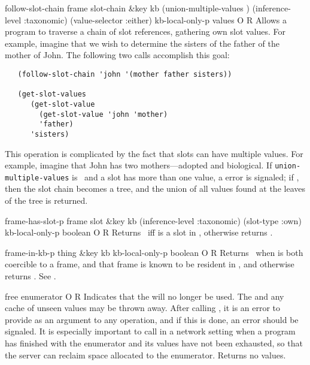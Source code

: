 \begin{okbcop}{follow-slot-chain}{ frame slot-chain \&key kb (union-multiple-values \true) (inference-level :taxonomic) (value-selector :either) kb-local-only-p} { values } { O } { R } {  }
Allows a program to traverse a chain of slot references,
   gathering own slot values.  For example, imagine that we wish to determine
   the sisters of the father of the mother of John.  The following two calls
   accomplish this goal:
   \begin{verbatim}
   (follow-slot-chain 'john '(mother father sisters))
	
   (get-slot-values
      (get-slot-value
        (get-slot-value 'john 'mother)
        'father)
      'sisters)
   \end{verbatim}
   This operation is complicated by the fact that slots can have multiple
   values.  For example, imagine that John has two mothers---adopted and
   biological.  If {\tt union-multiple-values} is \false\ and a slot
   has more than one value, a  error is signaled;
   if \true, then the slot chain becomes a tree, and the union of
   all values found at the leaves of the tree is returned.
\end{okbcop}

\begin{okbcop}{frame-has-slot-p}{ frame slot \&key kb (inference-level :taxonomic) (slot-type :own) kb-local-only-p} { boolean } { O } { R } {  }
Returns \true\ iff  is a slot in ,
   otherwise returns \false.
\end{okbcop}

\begin{okbcop}{frame-in-kb-p}{ thing \&key kb kb-local-only-p} { boolean } { O } { R } {  }
Returns \true\ when  is both coercible to
   a frame, and that frame is known to be resident in , and otherwise
   returns \false.  See .
\end{okbcop}

\begin{okbcop}{free}{ enumerator} { \void } { O } { R } {  }
Indicates that the  will no longer be used.  The
    and any cache of unseen values may be thrown away.
   After calling , it is an error to provide 
   as an argument to any operation, and if this is done, an
    error should be signaled.  It is especially important
   to call  in a network setting when a program has finished
   with the enumerator and its values have not been exhausted, so that
   the server can reclaim space allocated to the enumerator.
   Returns no values.
\end{okbcop}

